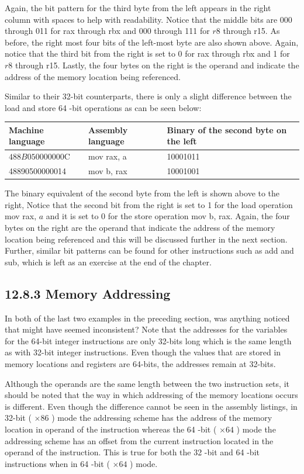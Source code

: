 \documentclass[10pt]{book}
\begin{document}
Again, the bit pattern for the third byte from the left appears in the right column with spaces to help with readability. Notice that the middle bits are 000 through 011 for rax through rbx and 000 through 111 for $r 8$ through r15. As before, the right most four bits of the left-most byte are also shown above. Again, notice that the third bit from the right is set to 0 for rax through rbx and 1 for $r 8$ through r15. Lastly, the four bytes on the right is the operand and indicate the address of the memory location being referenced.

Similar to their 32-bit counterparts, there is only a slight difference between the load and store 64 -bit operations as can be seen below:

\begin{center}
\begin{tabular}{|l|l|l|}
\hline
Machine language & Assembly language & Binary of the second byte on the left \\
\hline
$488 B 050000000 \mathrm{C}$ & mov rax, a & 10001011 \\
\hline
48890500000014 & mov b, rax & 10001001 \\
\hline
\end{tabular}
\end{center}

The binary equivalent of the second byte from the left is shown above to the right, Notice that the second bit from the right is set to 1 for the load operation mov rax, $a$ and it is set to 0 for the store operation mov b, rax. Again, the four bytes on the right are the operand that indicate the address of the memory location being referenced and this will be discussed further in the next section. Further, similar bit patterns can be found for other instructions such as add and sub, which is left as an exercise at the end of the chapter.

\subsection*{12.8.3 Memory Addressing}
In both of the last two examples in the preceding section, was anything noticed that might have seemed inconsistent? Note that the addresses for the variables for the 64-bit integer instructions are only 32-bits long which is the same length as with 32-bit integer instructions. Even though the values that are stored in memory locations and registers are 64-bits, the addresses remain at 32-bits.


Although the operands are the same length between the two instruction sets, it should be noted that the way in which addressing of the memory locations occurs is different. Even though the difference cannot be seen in the assembly listings, in 32-bit ( $\times 86$ ) mode the addressing scheme has the address of the memory location in operand of the instruction whereas the 64 -bit ( $\times 64$ ) mode the addressing scheme has an offset from the current instruction located in the operand of the instruction. This is true for both the 32 -bit and 64 -bit instructions when in 64 -bit ( $\times 64$ ) mode.
\end{document}
